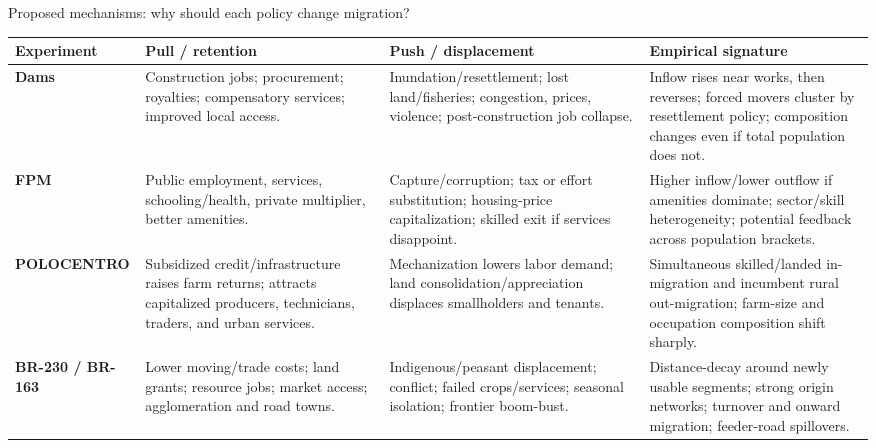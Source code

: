 \documentclass[aspectratio=169,10pt]{beamer}
\begin{document}
\begin{frame}{Proposed mechanisms: why should each policy change migration?}
\scriptsize
\renewcommand{\arraystretch}{1.22}
\begin{tabularx}{\textwidth}{L{2.15cm}YYY}
\toprule
\textbf{Experiment} & \textbf{Pull / retention} & \textbf{Push / displacement} & \textbf{Empirical signature} \\
\midrule
\textbf{Dams} & Construction jobs; procurement; royalties; compensatory services; improved local access. & Inundation/resettlement; lost land/fisheries; congestion, prices, violence; post-construction job collapse. & Inflow rises near works, then reverses; forced movers cluster by resettlement policy; composition changes even if total population does not. \\
\textbf{FPM} & Public employment, services, schooling/health, private multiplier, better amenities. & Capture/corruption; tax or effort substitution; housing-price capitalization; skilled exit if services disappoint. & Higher inflow/lower outflow if amenities dominate; sector/skill heterogeneity; potential feedback across population brackets. \\
\textbf{POLOCENTRO} & Subsidized credit/infrastructure raises farm returns; attracts capitalized producers, technicians, traders, and urban services. & Mechanization lowers labor demand; land consolidation/appreciation displaces smallholders and tenants. & Simultaneous skilled/landed in-migration and incumbent rural out-migration; farm-size and occupation composition shift sharply. \\
\textbf{BR-230 / BR-163} & Lower moving/trade costs; land grants; resource jobs; market access; agglomeration and road towns. & Indigenous/peasant displacement; conflict; failed crops/services; seasonal isolation; frontier boom-bust. & Distance-decay around newly usable segments; strong origin networks; turnover and onward migration; feeder-road spillovers. \\
\bottomrule
\end{tabularx}
\end{frame}
\end{document}
